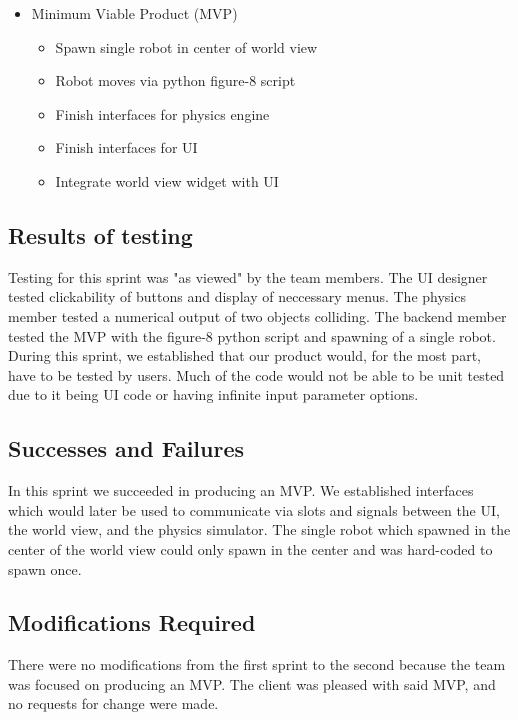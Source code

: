 \begin{itemize}
	\item Minimum Viable Product (MVP)
	\begin{itemize}
		\item Spawn single robot in center of world view
		\item Robot moves via python figure-8 script
		\item Finish interfaces for physics engine
		\item Finish interfaces for UI
		\item Integrate world view widget with UI
	\end{itemize}
\end{itemize}

\subsection{Results of testing}

Testing for this sprint was "as viewed" by the team members. The UI designer tested clickability of buttons and display of neccessary menus. The physics member tested a numerical output of two objects colliding. The backend member tested the MVP with the figure-8 python script and spawning of a single robot. During this sprint, we established that our product would, for the most part, have to be tested by users. Much of the code would not be able to be unit tested due to it being UI code or having infinite input parameter options.

\subsection{Successes and Failures}

In this sprint we succeeded in producing an MVP. We  established interfaces which would later be used to communicate via slots and signals between the UI, the world view, and the physics simulator. The single robot which spawned in the center of the world view could only spawn in the center and was hard-coded to spawn once. 

\subsection{Modifications Required}

There were no modifications from the first sprint to the second because the team was focused on producing an MVP. The client was pleased with said MVP, and no requests for change were made.

